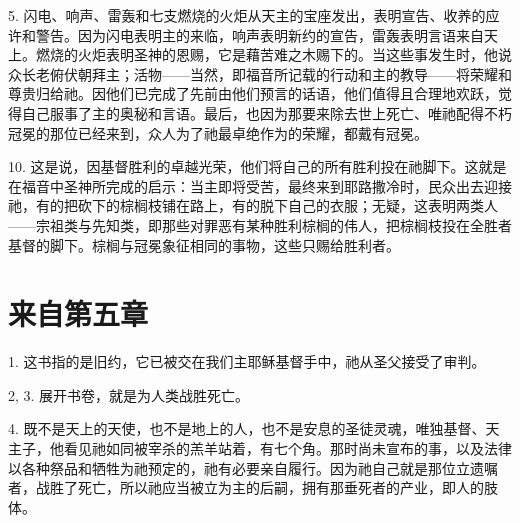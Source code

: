 5.  闪电、响声、雷轰和七支燃烧的火炬从天主的宝座发出，表明宣告、收养的应许和警告。因为闪电表明主的来临，响声表明新约的宣告，雷轰表明言语来自天上。燃烧的火炬表明圣神的恩赐，它是藉苦难之木赐下的。当这些事发生时，他说众长老俯伏朝拜主；活物——当然，即福音所记载的行动和主的教导——将荣耀和尊贵归给祂。因他们已完成了先前由他们预言的话语，他们值得且合理地欢跃，觉得自己服事了主的奥秘和言语。最后，也因为那要来除去世上死亡、唯祂配得不朽冠冕的那位已经来到，众人为了祂最卓绝作为的荣耀，都戴有冠冕。\par

10.  这是说，因基督胜利的卓越光荣，他们将自己的所有胜利投在祂脚下。这就是在福音中圣神所完成的启示：当主即将受苦，最终来到耶路撒冷时，民众出去迎接祂，有的把砍下的棕榈枝铺在路上，有的脱下自己的衣服；无疑，这表明两类人——宗祖类与先知类，即那些对罪恶有某种胜利棕榈的伟人，把棕榈枝投在全胜者基督的脚下。棕榈与冠冕象征相同的事物，这些只赐给胜利者。\par


\section{来自第五章}

1.  这书指的是旧约，它已被交在我们主耶稣基督手中，祂从圣父接受了审判。\par

2, 3.  展开书卷，就是为人类战胜死亡。\par

4.  既不是天上的天使，也不是地上的人，也不是安息的圣徒灵魂，唯独基督、天主子，他看见祂如同被宰杀的羔羊站着，有七个角。那时尚未宣布的事，以及法律以各种祭品和牺牲为祂预定的，祂有必要亲自履行。因为祂自己就是那位立遗嘱者，战胜了死亡，所以祂应当被立为主的后嗣，拥有那垂死者的产业，即人的肢体。\par

